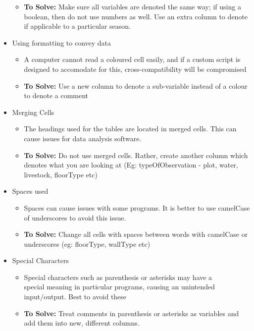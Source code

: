 \documentclass{article}
\begin{document}
\begin{itemize}
\begin{itemize}
        \item \textbf{To Solve:} Make sure all variables are denoted the same way; if using a boolean, then do not use numbers as well. Use an extra column to denote if applicable to a particular season.
    \end{itemize}
    \item Using formatting to convey data
    \begin{itemize}
        \item A computer cannot read a coloured cell easily, and if a custom script is designed to accomodate for this, cross-compatibility will be compromised
        \item \textbf{To Solve:} Use a new column to denote a sub-variable instead of a colour to denote a comment
    \end{itemize}
    \item Merging Cells
    \begin{itemize}
        \item The headings used for the tables are located in merged cells. This can cause issues for data analysis software.
        \item \textbf{To Solve:} Do not use merged cells. Rather, create another column which denotes what you are looking at (Eg: typeOfObservation - plot, water, livestock, floorType etc)
    \end{itemize}
    \item Spaces used
    \begin{itemize}
        \item Spaces can cause issues with some programs. It is better to use camelCase of underscores to avoid this issue.
        \item \textbf{To Solve:} Change all cells with spaces between words with camelCase or underscores (eg: floorType, wallType etc)
    \end{itemize}
    \item Special Characters
    \begin{itemize}
        \item Special characters such as parenthesis or asterisks may have a \\
        special meaning in particular programs, causing an unintended input/output. Best to avoid these
        \item \textbf{To Solve:} Treat comments in parenthesis or asterisks as variables and add them into new, different columns.
    \end{itemize}
\end{itemize}
\end{document}

